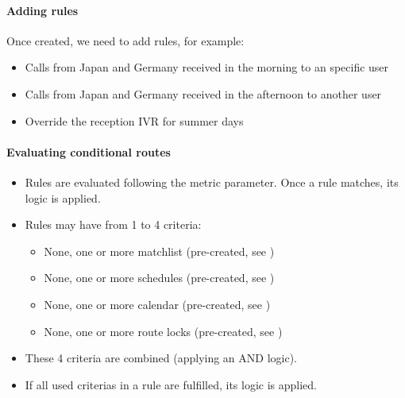 \documentclass[letterpaper,10pt,spanish]{sphinxmanual}
\begin{document}
\paragraph{Adding rules}
\label{administration_portal/client/vpbx/routing_endpoints/conditional_routes:adding-rules}
Once created, we need to add rules, for example:
\begin{itemize}
\item {} 
Calls from Japan and Germany received in the morning to an specific user

\item {} 
Calls from Japan and Germany received in the afternoon to another user

\item {} 
Override the reception IVR for summer days

\end{itemize}


\paragraph{Evaluating conditional routes}
\label{administration_portal/client/vpbx/routing_endpoints/conditional_routes:evaluating-conditional-routes}\begin{itemize}
\item {} 
Rules are evaluated following the metric parameter. Once a rule matches, its
logic is applied.

\item {} 
Rules may have from 1 to 4 criteria:
\begin{itemize}
\item {} 
None, one or more matchlist (pre-created, see {\hyperref[administration_portal/client/vpbx/routing_tools/match_lists:match\string-lists]{}})

\item {} 
None, one or more schedules (pre-created, see {\hyperref[administration_portal/client/vpbx/routing_tools/schedules:schedules]{}})

\item {} 
None, one or more calendar (pre-created, see {\hyperref[administration_portal/client/vpbx/routing_tools/calendars:calendars]{}})

\item {} 
None, one or more route locks (pre-created, see {\hyperref[administration_portal/client/vpbx/routing_tools/route_locks:id1]{}})

\end{itemize}

\item {} 
These 4 criteria are combined (applying an AND logic).

\item {} 
If all used criterias in a rule are fulfilled, its logic is applied.

\end{itemize}
\end{document}

